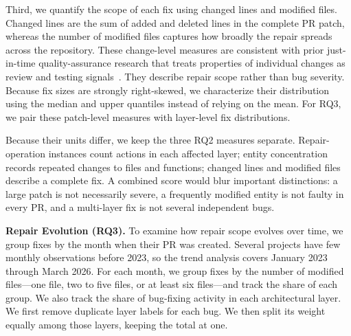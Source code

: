 Third, we quantify the scope of each fix using changed lines and modified files. Changed lines are the sum of added and deleted lines in the complete PR patch, whereas the number of modified files captures how broadly the repair spreads across the repository. These change-level measures are consistent with prior just-in-time quality-assurance research that treats properties of individual changes as review and testing signals~\cite{kamei2013jitqa}. They describe repair scope rather than bug severity. Because fix sizes are strongly right-skewed, we characterize their distribution using the median and upper quantiles instead of relying on the mean. For RQ3, we pair these patch-level measures with layer-level fix distributions.

Because their units differ, we keep the three RQ2 measures separate. Repair-operation instances count actions in each affected layer; entity concentration records repeated changes to files and functions; changed lines and modified files describe a complete fix. A combined score would blur important distinctions: a large patch is not necessarily severe, a frequently modified entity is not faulty in every PR, and a multi-layer fix is not several independent bugs.

\textbf{Repair Evolution (RQ3).} To examine how repair scope evolves over time, we group fixes by the month when their PR was created. Several projects have few monthly observations before 2023, so the trend analysis covers January 2023 through March 2026. For each month, we group fixes by the number of modified files---one file, two to five files, or at least six files---and track the share of each group. We also track the share of bug-fixing activity in each architectural layer. We first remove duplicate layer labels for each bug. We then split its weight equally among those layers, keeping the total at one.

